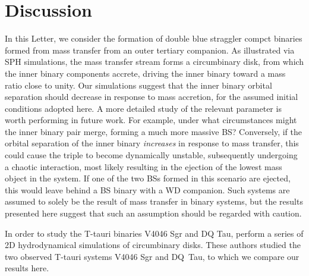 \documentclass{aastex62}
\begin{document}
{\section{Discussion} \label{sect:discussion}

In this Letter, we consider the formation of double blue straggler compct binaries formed 
from mass transfer from an outer tertiary companion.  As illustrated via SPH simulations, 
the mass transfer stream forms a circumbinary 
disk, from which the inner binary components accrete, driving the inner binary toward a 
mass ratio close to unity.  Our simulations suggest that the inner binary orbital separation 
should decrease in response to mass accretion, for the assumed initial conditions adopted here.  A more 
detailed study of the relevant parameter is worth performing in future work.  For example, under what circumstances 
might the inner binary pair merge, forming a much more massive BS?  Conversely, if the orbital 
separation of the inner binary \textit{increases} in response to mass transfer, this could 
cause the triple to become dynamically unstable, subsequently undergoing a chaotic interaction, most likely 
resulting in the ejection of the lowest mass object in the system.  If one of the two BSs formed in 
this scenario are ejected, this would leave behind a BS binary with a WD companion.  Such systems 
are assumed to solely be the result of mass transfer in binary systems, but the results presented here 
suggest that such an assumption should be regarded with caution.

In order to study the T-tauri binaries V4046 Sgr and DQ Tau, 
\cite{2011MNRAS.413.2679D} perform a series of 2D hydrodynamical
simulations of circumbinary disks.  These authors studied the two observed
T-tauri systems V4046 Sgr and DQ~Tau, to which we compare our results here.

}
\end{document}
